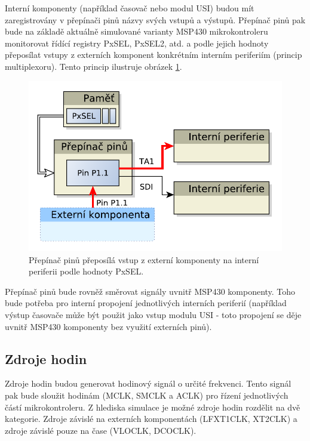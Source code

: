 Interní komponenty (například časovač nebo modul USI) budou mít zaregistrovány v přepínači pinů názvy svých vstupů a výstupů.
Přepínač pinů pak bude na základě aktuálně simulované varianty MSP430 mikrokontroleru monitorovat řídící registry PxSEL, PxSEL2, atd. a podle jejich hodnoty přeposílat vstupy z externích komponent konkrétním interním periferiím (princip multiplexoru). Tento princip ilustruje obrázek \ref{fig:msp430_pinmult}.

\begin{figure}[h]
\centering
\includegraphics[trim=0cm 0cm 0cm 0cm, scale=0.7]{fig/msp430_pinmult}
\caption{Přepínač pinů přeposílá vstup z externí komponenty na interní periferii podle hodnoty PxSEL.}
\label{fig:msp430_pinmult}
\end{figure}

Přepínač pinů bude rovněž směrovat signály uvnitř MSP430 komponenty. Toho bude potřeba pro interní propojení jednotlivých interních periferií (například výstup časovače může být použit jako vstup modulu USI - toto propojení se děje uvnitř MSP430 komponenty bez využití externích pinů).

\subsection{Zdroje hodin}

Zdroje hodin budou generovat hodinový signál o určité frekvenci. Tento signál pak bude sloužit hodinám (MCLK, SMCLK a ACLK) pro řízení jednotlivých částí mikrokontroleru. Z hlediska simulace je možné zdroje hodin rozdělit na dvě kategorie. Zdroje závislé na externích komponentách (LFXT1CLK, XT2CLK) a zdroje závislé pouze na čase (VLOCLK, DCOCLK).

